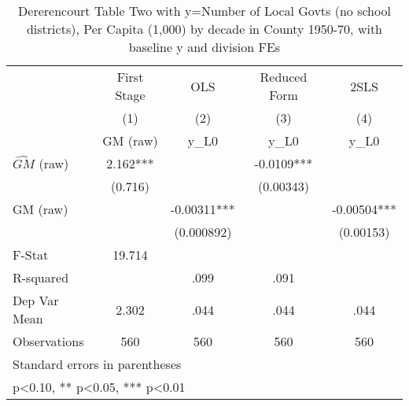 \begin{table}[htbp]\centering
\def\sym#1{\ifmmode^{#1}\else\(^{#1}\)\fi}
\caption{Dererencourt Table Two with y=Number of Local Govts (no school districts), Per Capita (1,000) by decade in County 1950-70, with baseline y and division FEs}
\begin{tabular}{l*{4}{c}}
\toprule
                    & First Stage   &         OLS   &Reduced Form   &        2SLS   \\
                    &\multicolumn{1}{c}{(1)}&\multicolumn{1}{c}{(2)}&\multicolumn{1}{c}{(3)}&\multicolumn{1}{c}{(4)}\\
                    &\multicolumn{1}{c}{GM  (raw)}&\multicolumn{1}{c}{y\_L0}&\multicolumn{1}{c}{y\_L0}&\multicolumn{1}{c}{y\_L0}\\
\midrule
$\hat{GM}$ (raw)    &       2.162***&               &     -0.0109***&               \\
                    &     (0.716)   &               &   (0.00343)   &               \\
\addlinespace
GM  (raw)           &               &    -0.00311***&               &    -0.00504***\\
                    &               &  (0.000892)   &               &   (0.00153)   \\
\midrule
F-Stat              &      19.714   &               &               &               \\
R-squared           &               &        .099   &        .091   &               \\
Dep Var Mean        &       2.302   &        .044   &        .044   &        .044   \\
Observations        &         560   &         560   &         560   &         560   \\
\bottomrule
\multicolumn{5}{l}{\footnotesize Standard errors in parentheses}\\
\multicolumn{5}{l}{\footnotesize * p<0.10, ** p<0.05, *** p<0.01}\\
\end{tabular}
\end{table}
